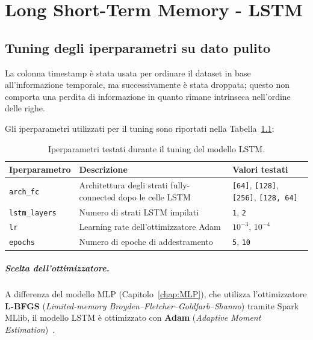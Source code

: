 \documentclass[../main.tex]{subfiles}
\begin{document}
\chapter{Long Short-Term Memory - LSTM}
\label{chap:LSTM}

\section{Tuning degli iperparametri su dato pulito}
La colonna timestamp è stata usata per ordinare il dataset in base all'informazione temporale, ma successivamente è stata droppata; questo non comporta una perdita di informazione in quanto rimane intrinseca nell'ordine delle righe.

Gli iperparametri utilizzati per il tuning sono riportati nella Tabella~\ref{tab:lstm_iperparametri}:

\begin{table}[H]
    \centering
    \begin{tabular}{|l|p{5cm}|p{5cm}|}
        \hline
        \textbf{Iperparametro} & \textbf{Descrizione} & \textbf{Valori testati} \\
        \hline
        \texttt{arch\_fc}
          & Architettura degli strati fully-connected dopo le celle LSTM & \texttt{[64]}, \texttt{[128]}, \texttt{[256]}, \texttt{[128, 64]} \\ \hline
        \texttt{lstm\_layers}
          & Numero di strati LSTM impilati & \texttt{1}, \texttt{2} \\ \hline
        \texttt{lr}
          & Learning rate dell'ottimizzatore Adam & \texttt{$10^{-3}$}, \texttt{$10^{-4}$} \\ \hline
        \texttt{epochs}
          & Numero di epoche di addestramento & \texttt{5}, \texttt{10} \\ \hline
    \end{tabular}
    \caption{Iperparametri testati durante il tuning del modello LSTM.}
    \label{tab:lstm_iperparametri}
\end{table}

\paragraph{Scelta dell'ottimizzatore.}
A differenza del modello MLP (Capitolo~\ref{chap:MLP}), che utilizza l'ottimizzatore \textbf{L-BFGS} (\textit{Limited-memory Broyden–Fletcher–Goldfarb–Shanno}) tramite Spark MLlib, il modello LSTM è ottimizzato con \textbf{Adam} (\textit{Adaptive Moment Estimation})~\cite{kingma2017adammethodstochasticoptimization}.
\end{document}
